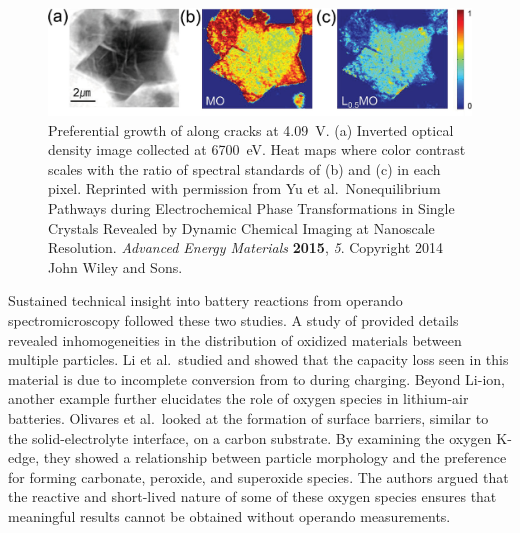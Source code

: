 \documentclass[journal=cmatex,manuscript=perspective]{achemso}
\begin{document}
\begin{figure}
  \includegraphics[width=\textwidth]{yu2015}
  \caption{Preferential growth of  along cracks at
    \SI{4.09}{V}. (a) Inverted optical density image collected at
    \SI{6700}{eV}. Heat maps where color contrast scales with the
    ratio of spectral standards of (b)  and (c)
     in each pixel. Reprinted with permission from
    Yu et al.\ Nonequilibrium Pathways during Electrochemical Phase
    Transformations in Single Crystals Revealed by Dynamic Chemical
    Imaging at Nanoscale Resolution. \textit{Advanced Energy
      Materials} \textbf{2015}, \textit{5}. Copyright 2014 John Wiley
    and Sons.}
  \label{figure:yu2015}
\end{figure}

Sustained technical insight into battery reactions from operando
spectromicroscopy followed these two studies. A study of 
provided details revealed inhomogeneities in the distribution of
oxidized materials between multiple particles\cite{wang2014}. Li et
al.\ studied  and showed that the capacity loss seen in this
material is due to incomplete conversion from  to 
during charging\cite{jin2015}. Beyond Li-ion, another example further
elucidates the role of oxygen species in lithium-air
batteries. Olivares et al.\ looked at the formation of surface
barriers, similar to the solid-electrolyte interface, on a carbon
substrate. By examining the oxygen K-edge, they showed a relationship
between particle morphology and the preference for forming carbonate,
peroxide, and superoxide species\cite{olivares2015}. The authors
argued that the reactive and short-lived nature of some of these
oxygen species ensures that meaningful results cannot be obtained
without operando measurements.
\end{document}
